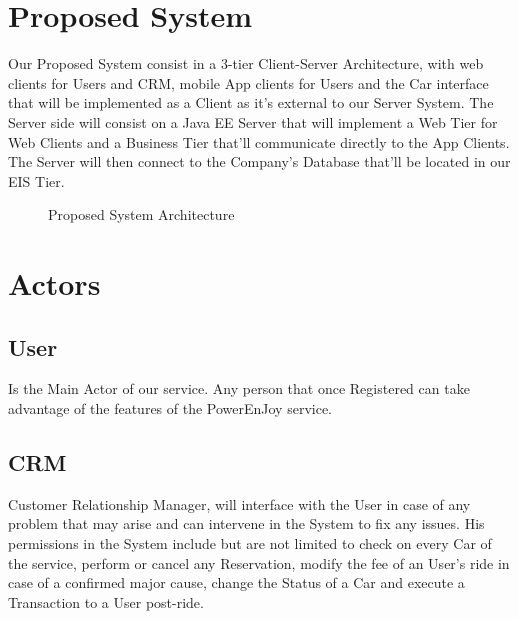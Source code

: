 \documentclass[a4paper]{article}
\begin{document}
\newpage
\section{Proposed System}
Our Proposed System consist in a 3-tier Client-Server Architecture, with web clients for Users and CRM, mobile App clients for Users and the Car interface that will be implemented as a Client as it's external to our Server System. The Server side will consist on a Java EE Server that will implement a Web Tier for Web Clients and a Business Tier that'll communicate directly to the App Clients. The Server will then connect to the Company's Database that'll be located in our EIS Tier.
\begin{figure}[h]
\centering
\vspace*{\fill}
\noindent{}%
\caption {Proposed System Architecture}
\vspace*{0.5cm}
\end{figure}
\newpage

\section{Actors}
\subsection{User}
Is the Main Actor of our service. Any person that once Registered can take advantage of the features of the PowerEnJoy service.
\subsection {CRM}
Customer Relationship Manager, will interface with the User in case of any problem that may arise and can intervene in the System to fix any issues. His permissions in the System include but are not limited to check on every Car of the service, perform or cancel any Reservation, modify the fee of an User's ride in case of a confirmed major cause, change the Status of a Car and execute a Transaction to a User post-ride.
\end{document}
